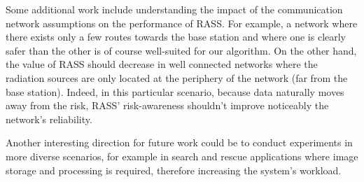 \documentclass[runningheads]{llncs}
\begin{document}
Some additional work include understanding the impact of the communication network assumptions on the performance of RASS. For example, a network where there exists only a few routes towards the base station and where one is clearly safer than the other is of course well-suited for our algorithm. On the other hand, the value of RASS should decrease in well connected networks where the radiation sources are only located at the periphery of the network (far from the base station). Indeed, in this particular scenario, because data naturally moves away from the risk, RASS' risk-awareness shouldn't improve noticeably the network's reliability.

Another interesting direction for future work could be to conduct experiments in more diverse scenarios, for example in search and rescue applications where image storage and processing is required, therefore increasing the system's workload.


%
%
%


%
\end{document}
